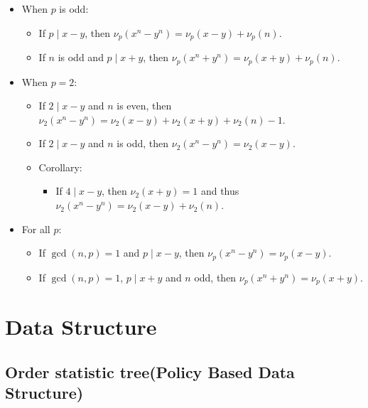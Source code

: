 \documentclass[9pt,landscape,a4paper,twocolumn]{extarticle}
\begin{document}
\begin{itemize}
    \item When $p$ is odd:
    \begin{itemize}
        \item If $p \mid x-y$, then $\nu_p(x^n-y^n) = \nu_p(x-y)+\nu_p(n)$.
        \item If $n$ is odd and $p \mid x+y$, then $\nu_p(x^n+y^n) = \nu_p(x+y)+\nu_p(n)$.
    \end{itemize}
    \item When $p = 2$:
    \begin{itemize}
        \item If $2 \mid x-y$ and $n$ is even, then $\nu_2(x^n-y^n) = \nu_2(x-y)+\nu_2(x+y)+\nu_2(n)-1$.
        \item If $2 \mid x-y$ and $n$ is odd, then $\nu_2(x^n-y^n) = \nu_2(x-y)$.
        \item Corollary:
        \begin{itemize}
            \item If $4 \mid x-y$, then $\nu_2(x+y)=1$ and thus $\nu_2(x^n-y^n) = \nu_2(x-y)+\nu_2(n)$.
        \end{itemize}
    \end{itemize}
    \item For all $p$:
    \begin{itemize}
        \item If $\gcd(n,p) = 1$ and $p \mid x-y$, then $\nu_p(x^n-y^n) = \nu_p(x-y)$.
        \item If $\gcd(n,p) = 1$, $p \mid x+y$ and $n$ odd, then $\nu_p(x^n+y^n) = \nu_p(x+y)$.
    \end{itemize}
\end{itemize}

\section{Data Structure}

\subsection{Order statistic tree(Policy Based Data Structure)}

\end{document}
